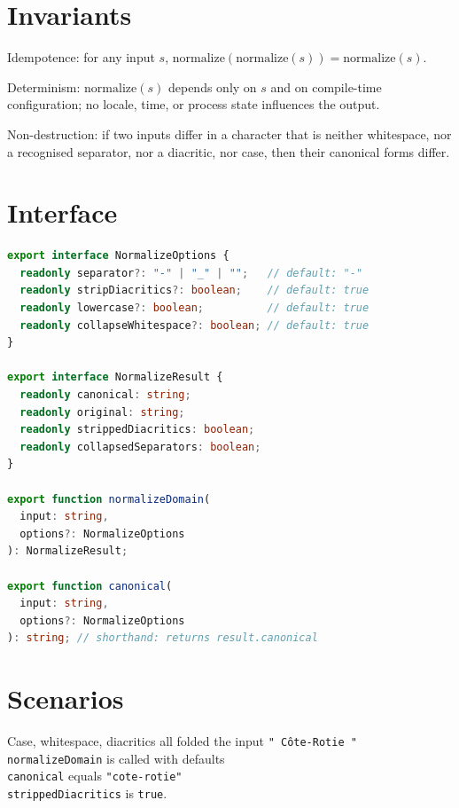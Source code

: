 \section{Invariants}
\begin{invariant}
Idempotence: for any input \(s\), \(\mathrm{normalize}(\mathrm{normalize}(s)) = \mathrm{normalize}(s)\).
\end{invariant}

\begin{invariant}
Determinism: \(\mathrm{normalize}(s)\) depends only on \(s\) and on compile-time configuration; no locale, time, or process state influences the output.
\end{invariant}

\begin{invariant}
Non-destruction: if two inputs differ in a character that is neither whitespace, nor a recognised separator, nor a diacritic, nor case, then their canonical forms differ.
\end{invariant}

\section{Interface}

\begin{lstlisting}[language=TypeScript]
export interface NormalizeOptions {
  readonly separator?: "-" | "_" | "";   // default: "-"
  readonly stripDiacritics?: boolean;    // default: true
  readonly lowercase?: boolean;          // default: true
  readonly collapseWhitespace?: boolean; // default: true
}

export interface NormalizeResult {
  readonly canonical: string;
  readonly original: string;
  readonly strippedDiacritics: boolean;
  readonly collapsedSeparators: boolean;
}

export function normalizeDomain(
  input: string,
  options?: NormalizeOptions
): NormalizeResult;

export function canonical(
  input: string,
  options?: NormalizeOptions
): string; // shorthand: returns result.canonical
\end{lstlisting}

\section{Scenarios}

\begin{scenario}{Case, whitespace, diacritics all folded}
\Given the input \texttt{"  C\^{o}te-Rotie  "} \\
\When \texttt{normalizeDomain} is called with defaults \\
\Then \texttt{canonical} equals \texttt{"cote-rotie"} \\
\And \texttt{strippedDiacritics} is \texttt{true}.
\end{scenario}

